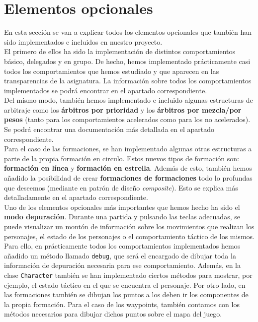 \medskip
\section{Elementos opcionales}

En esta sección se van a explicar todos los elementos opcionales que también han sido implementados e incluidos en nuestro proyecto. \\

El primero de ellos ha sido la implementación de distintos comportamientos básico, delegados y en grupo. De hecho, hemos implementado prácticamente casi todos los comportamientos que hemos estudiado y que aparecen en las transparencias de la asignatura. La información sobre todos los comportamientos implementados se podrá encontrar en el apartado correspondiente. \\

Del mismo modo, también hemos implementado e incluido algunas estructuras de arbitraje como los \textbf{árbitros por prioridad} y los \textbf{árbitros por mezcla/por pesos} (tanto para los comportamientos acelerados como para los no acelerados). Se podrá encontrar una documentación más detallada en el apartado correspondiente. \\

Para el caso de las formaciones, se han implementado algunas otras estructuras a parte de la propia formación en circulo. Estos nuevos tipos de formación son: \textbf{formación en línea} y \textbf{formación en estrella}. Además de esto, también hemos añadido la posibilidad de crear \textbf{formaciones de formaciones} todo lo profundas que deseemos (mediante en patrón de diseño \textit{composite}). Esto se explica más detalladamente en el apartado correspondiente. \\

Uno de los elementos opcionales más importantes que hemos hecho ha sido el \textbf{modo depuración}. Durante una partida y pulsando las teclas adecuadas, se puede visualizar un montón de información sobre los movimientos que realizan los personajes, el estado de los personajes o el comportamiento táctico de los mismos. Para ello, en prácticamente todos los comportamientos implementados hemos añadido un método llamado \texttt{debug}, que será el encargado de dibujar toda la información de depuración necesaria para ese comportamiento. Además, en la clase \texttt{Character} también se han implementado ciertos métodos para mostrar, por ejemplo, el estado táctico en el que se encuentra el personaje. Por otro lado, en las formaciones también se dibujan los puntos a los deben ir los componentes de la propia formación. Para el caso de los waypoints, también contamos con los métodos necesarios para dibujar dichos puntos sobre el mapa del juego. \\

